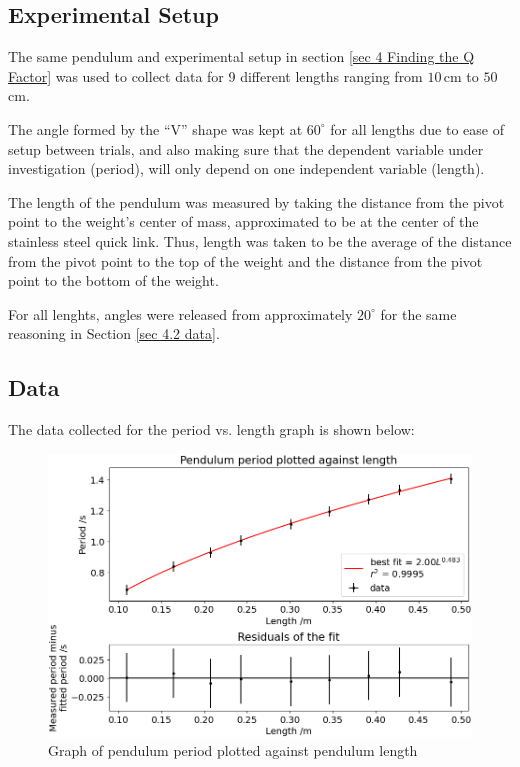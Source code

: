 \documentclass[11pt]{article}
\begin{document}
\begin{multicols}{2}
\subsection{Experimental Setup}
The same pendulum and experimental setup in section \ref{sec 4 Finding the Q Factor} was used to collect data for 9 different lengths ranging from $10\,$cm to $50\,$cm.

The angle formed by the ``V'' shape was kept at $60^\circ$ for all lengths due to ease of setup between trials, and also making sure that the dependent variable under investigation (period), will only depend on one independent variable (length).

The length of the pendulum was measured by taking the distance from the pivot point to the weight's center of mass, approximated to be at the center of the stainless steel quick link. Thus, length was taken to be the average of the distance from the pivot point to the top of the weight and the distance from the pivot point to the bottom of the weight.

For all lenghts, angles were released from approximately $20^\circ$ for the same reasoning in Section \ref{sec 4.2 data}.

\subsection{Data}
The data collected for the period vs. length graph is shown below:

\begin{figure}[H]
    \centering
    \includegraphics[width=\linewidth]{../figures/period_vs_length.png}
    \caption{\centering Graph of pendulum period plotted against pendulum length}
    \label{fig:figure 6}
\end{figure}


\end{multicols}
\end{document}
